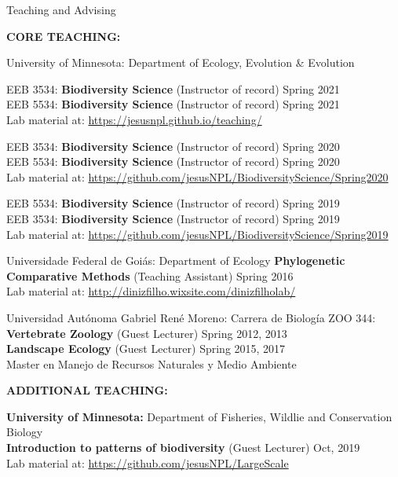 \documentclass{resume} %
\begin{document}
\begin{rSection}{Teaching and Advising}

\textbf{CORE TEACHING:}

\begin{reSubsection}{University of Minnesota: }{Department of Ecology, Evolution \& Evolution }{}{
EEB 3534: \textbf{Biodiversity Science} (Instructor of record) \hfill Spring 2021 \\ 
EEB 5534: \textbf{Biodiversity Science} (Instructor of record) \hfill Spring 2021 \\ 
{Lab material at:
\url{https://jesusnpl.github.io/teaching/}} \smallskip

EEB 3534: \textbf{Biodiversity Science} (Instructor of record) \hfill Spring 2020 \\ 
EEB 5534: \textbf{Biodiversity Science} (Instructor of record) \hfill Spring 2020 \\ 
{Lab material at:
\url{https://github.com/jesusNPL/BiodiversityScience/Spring2020}} \smallskip 

EEB 5534: \textbf{Biodiversity Science} (Instructor of record) \hfill Spring 2019 \\  
EEB 3534: \textbf{Biodiversity Science} (Instructor of record) \hfill Spring 2019 \\ 
{Lab material at:
\url{https://github.com/jesusNPL/BiodiversityScience/Spring2019}} \smallskip 
}
\end{reSubsection}

\begin{reSubsection}{Universidade Federal de Goiás: }{Department of Ecology }{}{
\textbf{Phylogenetic Comparative Methods} (Teaching Assistant) \hfill Spring 2016 \\ 
{Lab material at:
\url{http://dinizfilho.wixsite.com/dinizfilholab/}} \smallskip 
} 
\end{reSubsection}

\begin{reSubsection}{Universidad Autónoma Gabriel René Moreno: }{Carrera de Biología }{}{
ZOO 344: \textbf{Vertebrate Zoology} (Guest Lecturer) \hfill Spring 2012, 2013 \\ \textbf{Landscape Ecology} (Guest Lecturer) \hfill Spring 2015, 2017 \\
{Master en Manejo de Recursos Naturales y Medio Ambiente} \smallskip 
} 
\end{reSubsection}

\textbf{ADDITIONAL TEACHING:}

{\bf University of Minnesota: }{Department of Fisheries, Wildlie and Conservation Biology } \\
\textbf{Introduction to patterns of biodiversity} (Guest Lecturer) \hfill Oct, 2019 \\
{Lab material at:
\url{https://github.com/jesusNPL/LargeScale}}\smallskip 


\end{rSection}
\end{document}

